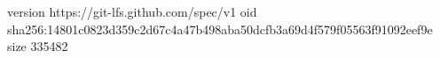 version https://git-lfs.github.com/spec/v1
oid sha256:14801c0823d359c2d67c4a47b498aba50dcfb3a69d4f579f05563f91092eef9e
size 335482
